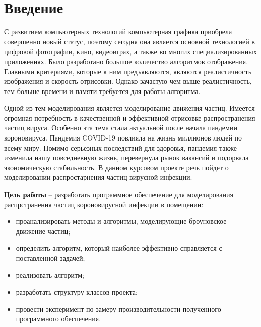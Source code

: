 \chapter*{Введение}

 С развитием компьютерных технологий компьютерная графика приобрела совершенно новый статус, поэтому сегодня она является основной технологией в цифровой фотографии, кино, видеоиграх, а также во многих специализированных приложениях. Было разработано большое количество алгоритмов отображения. Главными критериями, которые к ним предъявляются, являются реалистичность изображения и скорость отрисовки. Однако зачастую чем выше реалистичность, тем больше времени и памяти требуется для работы алгоритма.

Одной из тем моделирования является моделирование движения частиц. Имеется огромная потребность в качественной и эффективной отрисовке распространения частиц вируса. Особенно эта тема стала актуальной после начала пандемии короновируса. Пандемия COVID-19 повлияла на жизнь миллионов людей по всему миру. Помимо серьезных последствий для здоровья, пандемия также изменила нашу повседневную жизнь, перевернула рынок вакансий и подорвала экономическую стабильность. В данном курсовом проекте речь пойдет о моделировании распростарнения частиц вирусной инфекции.

\textbf{Цель работы} -- разработать программное обеспечение для моделирования распрстранения частиц короновирусной инфекции в помещении:

\begin{itemize}
	\item проанализировать методы и алгоритмы, моделирующие броуновское движение частиц; 
	\item определить алгоритм, который наиболее эффективно справляется с поставленной задачей;
	\item реализовать алгоритм;
	\item разработать структуру классов проекта;
	\item провести эксперимент по замеру производительности полученного программного обеспечения.
\end{itemize}
